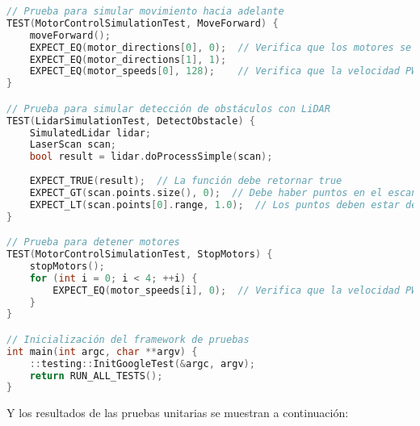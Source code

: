 \begin{lstlisting}[language={C++}, caption={Primera versi\'on del c\'odigo del sistema de control del robot}, label={Script}]
// Prueba para simular movimiento hacia adelante
TEST(MotorControlSimulationTest, MoveForward) {
    moveForward();
    EXPECT_EQ(motor_directions[0], 0);  // Verifica que los motores se dirigen hacia adelante
    EXPECT_EQ(motor_directions[1], 1);
    EXPECT_EQ(motor_speeds[0], 128);    // Verifica que la velocidad PWM es 50%
}

// Prueba para simular detección de obstáculos con LiDAR
TEST(LidarSimulationTest, DetectObstacle) {
    SimulatedLidar lidar;
    LaserScan scan;
    bool result = lidar.doProcessSimple(scan);
    
    EXPECT_TRUE(result);  // La función debe retornar true
    EXPECT_GT(scan.points.size(), 0);  // Debe haber puntos en el escaneo
    EXPECT_LT(scan.points[0].range, 1.0);  // Los puntos deben estar dentro del rango simulado
}

// Prueba para detener motores
TEST(MotorControlSimulationTest, StopMotors) {
    stopMotors();
    for (int i = 0; i < 4; ++i) {
        EXPECT_EQ(motor_speeds[i], 0);  // Verifica que la velocidad PWM de todos los motores es 0
    }
}

// Inicialización del framework de pruebas
int main(int argc, char **argv) {
    ::testing::InitGoogleTest(&argc, argv);
    return RUN_ALL_TESTS();
}

        \end{lstlisting}
    \vskip 0.5cm
    Y los resultados de las pruebas unitarias se muestran a continuaci\'on:
    